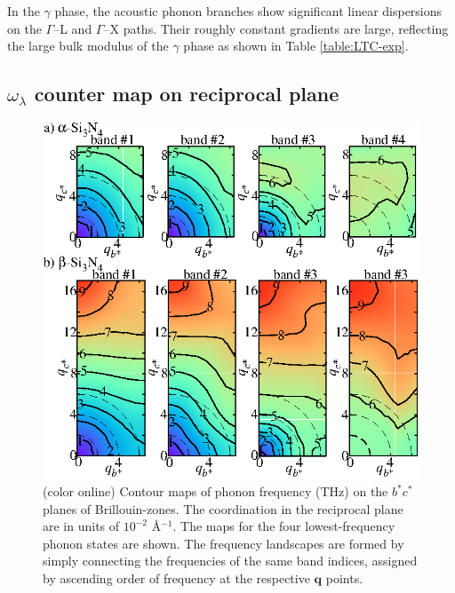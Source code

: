 \documentclass[twocolumn,amsmath,amssymb,a4paper,prb,superscriptaddress,floatfix]{revtex4-1}
\begin{document}
In the $\gamma$ phase, the acoustic phonon branches show significant linear
dispersions on the $\Gamma$--L and $\Gamma$--X paths.  Their roughly constant
gradients are large, reflecting the large bulk modulus
of the $\gamma$ phase as shown in Table \ref{table:LTC-exp}.

\subsection{$\omega_\lambda$ counter map on reciprocal plane}

\begin{figure}[ht]
 \centerins
  \includegraphics[width=\linewidth]{Fig2_small.eps} \caption{(color
  online) Contour maps of phonon frequency (THz) on the $b^*c^*$
  planes of Brillouin-zones. The coordination in the reciprocal plane 
   are in units of $10^{-2}$ \AA$^{-1}$. The maps for the four lowest-frequency
  phonon states are shown. The frequency landscapes are formed by simply
  connecting the frequencies of the same band indices, assigned by
  ascending order of frequency at the respective $\mathbf {q}$
  points. \label{fig:Fig3_338} }
 \centering
\end{figure}
\end{document}
